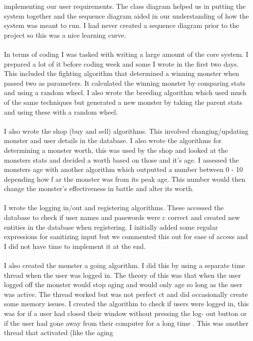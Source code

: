 \documentclass[titlepage]{article}
\begin{document}
{{{{implementing our user requirements. The class diagram helped us in putting the system together and 
the sequence diagram aided in our understanding of how the system was 
meant to run. I had never 
created a sequence diagram prior to the project so this was a nice learning curve. 
\\
\\
In terms of coding I was tasked with writing a large amount of the core system. I prepared a lot of it 
before coding week and some I wrote in the 
first two days. This included the fighting algorithm that 
determined a winning monster when passed two as parameters. It calculated the winning monster by 
comparing stats and using a random wheel. I also wrote the breeding algorithm which used much of 
the 
same techniques but generated a new monster by taking the parent stats and using these with a 
random wheel. 
\\
\\
I also wrote the shop (buy and sell) algorithms. This involved changing/updating monster and user 
details in the database. I also wrote the 
algorithms for determining a monster worth, this was used by 
the shop and looked at the monsters stats and decided a worth based on those and it's age. I assessed 
the monsters age with another algorithm which outputted a number between 0
-
10 depending how f
ar 
the monster was from 
its 
peak age. This number would then change the monster's effectiveness in 
battle and alter 
its 
worth. 
\\
\\
I wrote the logging in/out and registering algorithms. These accessed the database to check if user 
names and passwords were c
correct and created new entities in the database when registering. I 
initially added some regular expressions for sanitizing input but we commented this out for ease of 
access and I did not have time to implement it at the end.
\\
\\
I also created the monster a
going algorithm. I did this by using a separate time thread when the user 
was logged in. The theory of this was that when the user logged off the monster would stop aging and 
would only age so long as the user was active. The thread worked but was not perfect
ct and did 
occasionally create some memory issues. I created the algorithm to check if users were logged in, this 
was for if a user had closed their window without pressing the log-
out button or if the user had gone 
away from their computer for a long time
. This was another thread that activated (like the aging 
}}}}
\end{document}

